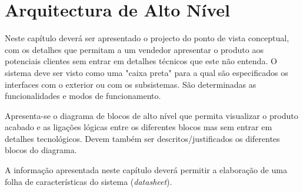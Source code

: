 \chapter{Arquitectura de Alto Nível}

Neste capítulo deverá ser apresentado o projecto do ponto de vista conceptual, com os detalhes que permitam a um vendedor apresentar o produto aos potenciais clientes sem entrar em detalhes técnicos que este não entenda.
O sistema deve ser visto como uma "caixa preta" para a qual são especificados os interfaces com o exterior ou com os subsistemas. São determinadas as funcionalidades e modos de funcionamento.

Apresenta-se o diagrama de blocos de alto nível que permita visualizar o produto acabado e as ligações lógicas entre os diferentes blocos mas sem entrar em detalhes tecnológicos. Devem também ser descritos/justificados os diferentes blocos do diagrama.

A informação apresentada neste capítulo deverá permitir a elaboração de uma folha de características do sistema \mbox{(\textit{datasheet})}.
